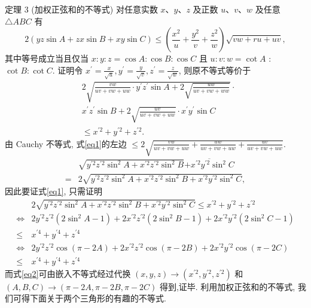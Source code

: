 定理 3 (加权正弦和的不等式) 对任意实数 $x 、 y 、 z$ 及正数 $u 、 v 、 w$ 及任意 $\triangle A B C$ 有
$$
2(y z \sin A+z x \sin B+x y \sin C) \leqslant\left(\frac{x^2}{u}+\frac{y^2}{v}+\frac{z^2}{w}\right) \sqrt{v w+r u+u v},
$$
其中等号成立当且仅当 $x: y: z=\cos A: \cos B: \cos C$ 且 $u: v: w=\cot A$ : $\cot B: \cot C$.
证明令 $x^{\prime}=\frac{x}{\sqrt{u}}, y^{\prime}=\frac{y}{\sqrt{v}}, z^{\prime}=\frac{z}{\sqrt{w}}$, 则原不等式等价于
$$
\begin{aligned}
& 2 \sqrt{\frac{v w}{u v+v w+u w} \cdot y^{\prime} z^{\prime} \sin A+2 \sqrt{\frac{u w}{u v+v w+w w}}} \cdot \\
& x^{\prime} z^{\prime} \sin B+2 \sqrt{\frac{u v}{u v+v w+u w}} \cdot x^{\prime} y^{\prime} \sin C \\
& \leqslant x^{\prime 2}+y^{\prime 2}+z^{\prime 2} .
\end{aligned} \label{eq1}
$$ 
由 Cauchy 不等式,
式\ref{eq1}的左边 $\leqslant 2 \sqrt{\frac{v w}{u v+v w+u w}+\frac{u w}{u v+v w+u w}+\frac{u v}{u v+v w+u w}}$.
$$
\begin{aligned}
& \sqrt{y^{\prime 2} z^{\prime 2} \sin ^2 A+x^{\prime 2} z^{\prime 2} \sin ^2 B} \overline{+x^{\prime 2} y^{\prime 2} \sin ^2 C} \\
= & 2 \sqrt{y^{\prime 2} z^{\prime 2} \sin ^2 A+x^{\prime 2} z^{\prime 2} \sin ^2 B+x^{\prime 2} y^{\prime 2} \sin ^2 C},
\end{aligned}
$$
因此要证式\ref{eq1}, 只需证明
$$
\begin{aligned}
& 2 \sqrt{y^{\prime 2} z^{\prime 2} \sin ^2 A+x^{\prime 2} z^{\prime 2} \sin ^2 B+x^{\prime 2} y^{\prime 2} \sin ^2 C} \leqslant x^{\prime 2}+y^{\prime 2}+z^{\prime 2} \\
\Leftrightarrow & 2 y^{\prime 2} z^{\prime 2}\left(2 \sin ^2 A-1\right)+2 x^{\prime 2} z^{\prime 2}\left(2 \sin ^2 B-1\right)+2 x^{\prime 2} y^{\prime 2}\left(2 \sin ^2 C-1\right) \\
\leqslant & x^{\prime 4}+y^{\prime 4}+z^{\prime 4} \\
\Leftrightarrow & 2 y^{\prime 2} z^{\prime 2} \cos (\pi-2 A)+2 x^{\prime 2} z^{\prime 2} \cos (\pi-2 B)+2 x^{\prime 2} y^{\prime 2} \cos (\pi-2 C) \\
\leqslant & x^{\prime 4}+y^{\prime 4}+z^{\prime 4}
\end{aligned} \label{eq2}
$$
而式\ref{eq2}可由嵌入不等式经过代换 $(x, y, z) \rightarrow\left(x^{\prime 2}, y^{\prime 2}, z^{\prime 2}\right)$ 和 $(A, B, C) \rightarrow (\pi-2 A, \pi-2 B, \pi-2 C)$ 得到,证毕.
利用加权正弦和的不等式, 我们可得下面关于两个三角形的有趣的不等式.



